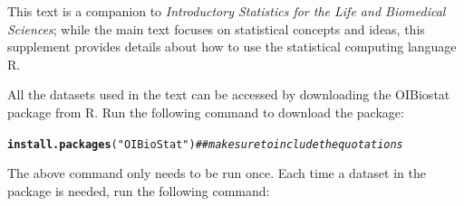 \documentclass{article}\usepackage[]{graphicx}\usepackage[]{color}
\makeatletter
\newcommand{\hlstr}[1]{\textcolor[rgb]{0.192,0.494,0.8}{#1}}%
\newcommand{\hlcom}[1]{\textcolor[rgb]{0.678,0.584,0.686}{\textit{#1}}}%
\newcommand{\hlstd}[1]{\textcolor[rgb]{0.345,0.345,0.345}{#1}}%
\newcommand{\hlkwd}[1]{\textcolor[rgb]{0.737,0.353,0.396}{\textbf{#1}}}%
\newenvironment{kframe}{%
 \def\at@end@of@kframe{}%
 \ifinner\ifhmode%
  \def\at@end@of@kframe{\end{minipage}}%
  \begin{minipage}{\columnwidth}%
 \fi\fi%
 \def\FrameCommand##1{\hskip\@totalleftmargin \hskip-\fboxsep
 \colorbox{shadecolor}{##1}\hskip-\fboxsep
     \hskip-\linewidth \hskip-\@totalleftmargin \hskip\columnwidth}%
 \MakeFramed {\advance\hsize-\width
   \@totalleftmargin\z@ \linewidth\hsize
   \@setminipage}}%
 {\par\unskip\endMakeFramed%
 \at@end@of@kframe}
\newenvironment{knitrout}{}{} %
\makeatother
\begin{document}
% 
% 
% 
% 




\tableofcontents


\vspace{1cm}
This text is a companion to \textit{Introductory Statistics for the Life and Biomedical Sciences}; while the main text focuses on statistical concepts and ideas, this supplement provides details about how to use the statistical computing language \textsf{R}.

All the datasets used in the text can be accessed by downloading the OIBiostat package from \textsf{R}. Run the following command to download the package:

\begin{knitrout}
\color{fgcolor}\begin{kframe}
\begin{alltt}
\hlkwd{install.packages}\hlstd{(}\hlstr{"OIBioStat"}\hlstd{)}  \hlcom{## make sure to include the quotations}
\end{alltt}
\end{kframe}
\end{knitrout}

The above command only needs to be run once. Each time a dataset in the package is needed, run the following command: 
\end{document}
